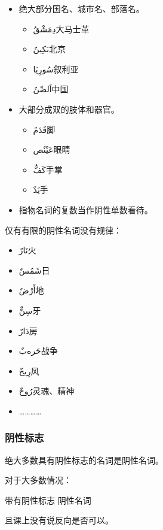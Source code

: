 \begin{itemize}
    \item 绝大部分国名、城市名、部落名。
    \begin{itemize}
        \item \ac{دِمَشْقُ}{大马士革}
        \item \ac{بَكِينُ}{北京}
        \item \ac{سُورِيَا}{叙利亚}
        \item \ac{اَلصِّنُ}{中国}
    \end{itemize}
    \item 大部分成双的肢体和器官。
    \begin{itemize}
        \item \ac{قَدَمٌ}{脚}
        \item \ac{عَيْنٌص}{眼睛}
        \item \ac{كَفٌّ}{手掌}
        \item \ac{يَدٌ}{手}
    \end{itemize}
    \item 指物名词的复数当作阴性单数看待。
\end{itemize}

仅有有限的阴性名词没有规律：

\begin{itemize}
    \item \ac{نَارٌ}{火}
    \item \ac{شَمُسٌ}{日}
    \item \ac{أَرْضٌ}{地}
    \item \ac{سِنٌّ}{牙}
    \item \ac{دَارٌ}{房}
    \item \ac{حَرەبٌ}{战争}
    \item \ac{رِيحٌ}{风}
    \item \ac{رُوحٌ}{灵魂、精神}
    \item …………
\end{itemize}

\subsubsection{阴性标志}

绝大多数具有阴性标志的名词是阴性名词。

\begin{note}
    对于大多数情况：
    
    \begin{center}
        带有阴性标志 \tto 阴性名词
    \end{center}

    且课上没有说反向是否可以。
\end{note}

